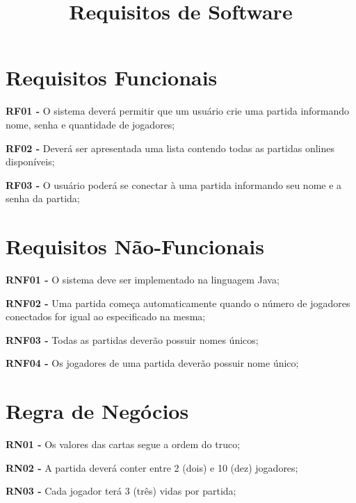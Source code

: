 \documentclass[a4paper, 12pt]{article}
\title{Requisitos de Software}
\date{}
\begin{document}
\maketitle

\section{Requisitos Funcionais}
\textbf{RF01 -}  O sistema deverá permitir que um usuário crie uma partida informando nome, senha e quantidade de jogadores;

\textbf{RF02 -} Deverá ser apresentada uma lista contendo todas as partidas onlines disponíveis;

\textbf{RF03 -} O usuário poderá se conectar à uma partida informando seu nome e a senha da partida;

\section{Requisitos Não-Funcionais}
\textbf{RNF01 -} O sistema deve ser implementado na linguagem Java;

\textbf{RNF02 -} Uma partida começa automaticamente quando o número de jogadores conectados for igual ao especificado na mesma;

\textbf{RNF03 -} Todas as partidas deverão possuir nomes únicos;

\textbf{RNF04 -} Os jogadores de uma partida deverão possuir nome único;

\section{Regra de Negócios}
\textbf{RN01 -} Os valores das cartas segue a ordem do truco;

\textbf{RN02 -} A partida deverá conter entre 2 (dois) e 10 (dez) jogadores;

\textbf{RN03 -} Cada jogador terá 3 (três) vidas por partida;
\end{document}
